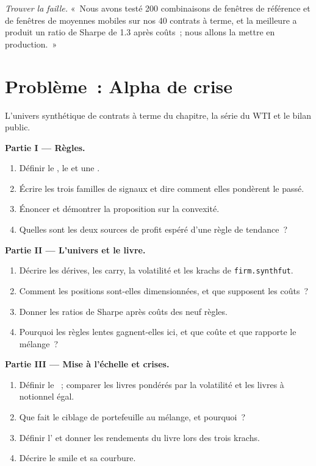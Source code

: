 \begin{exercise}[$\star\star\star$]\label{exo:s1:trend-following:8}
\emph{Trouver la faille.} «~Nous avons testé 200 combinaisons de fenêtres de référence et de fenêtres de moyennes mobiles sur nos 40 contrats à terme, et la meilleure a produit un ratio de Sharpe de 1.3
après coûts~; nous allons la mettre en production.~»
\end{exercise}

\section{Problème~: Alpha de crise}

\begin{problem}\label{pb:s1:trend-following:1}
L'univers synthétique de contrats à terme du chapitre, la série du WTI et le bilan public.

\medskip\noindent\textbf{Partie I --- Règles.}
\begin{enumerate}
\item Définir le , le  et une .
\item Écrire les trois familles de signaux et dire comment elles pondèrent le passé.
\item Énoncer et démontrer la proposition sur la convexité.
\item Quelles sont les deux sources de profit espéré d'une règle de tendance~?
\end{enumerate}

\medskip\noindent\textbf{Partie II --- L'univers et le livre.}
\begin{enumerate}[resume]
\item Décrire les dérives, les carry, la volatilité et les krachs de \texttt{firm.synthfut}.
\item Comment les positions sont-elles dimensionnées, et que supposent les coûts~?
\item Donner les ratios de Sharpe après coûts des neuf règles.
\item Pourquoi les règles lentes gagnent-elles ici, et que coûte et que rapporte le mélange~?
\end{enumerate}

\medskip\noindent\textbf{Partie III --- Mise à l'échelle et crises.}
\begin{enumerate}[resume]
\item Définir le ~; comparer les livres pondérés par la volatilité et les livres à notionnel égal.
\item Que fait le ciblage de portefeuille au mélange, et pourquoi~?
\item Définir l' et donner les rendements du livre lors des trois krachs.
\item Décrire le smile et sa courbure.
\end{enumerate}


\end{problem}
